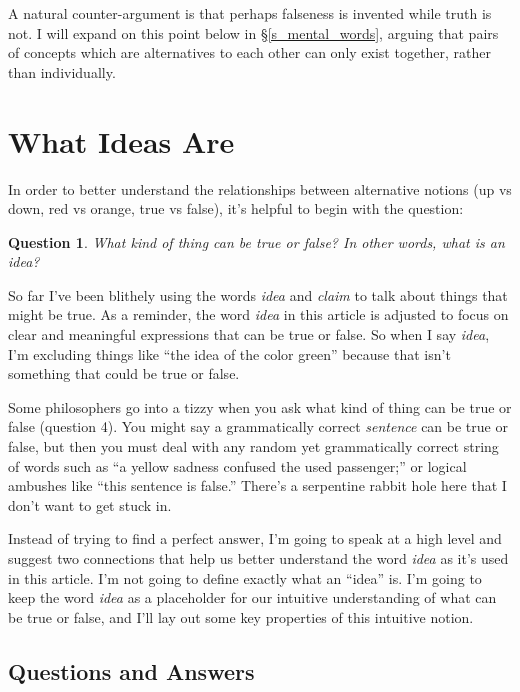 \documentclass[11pt, oneside]{article}
\newtheorem*{question*}{Question}
\begin{document}
A natural counter-argument is that perhaps falseness is invented while truth is
not.
I will expand on this point below in \S\ref{s_mental_words},
arguing that pairs of concepts which are alternatives to
each other can only exist together,
rather than individually.

\section{What Ideas Are}

In order to better understand the relationships between alternative
notions (up vs down, red vs orange, true vs false), it's
helpful to begin with the question:
\begin{question*}
    What kind of thing can be true or false?
    In other words, what is an idea?
\end{question*}

So far I've been blithely using the words {\em idea} and {\em claim} to talk
about things that might be true.
As a reminder, the word {\em idea} in this article is adjusted to focus on
clear and meaningful expressions that can be true or false.
So when I say {\em idea}, I'm excluding
things like ``the idea of the color green'' because that isn't something that
could be true or false.

Some philosophers go into a tizzy when you ask
what kind of thing can be true or false (question 4).
You might say a grammatically correct {\em sentence} can be true or false,
but then you must deal with any random yet grammatically correct string
of words such as
``a yellow sadness confused the used
passenger;'' or logical ambushes like ``this sentence is false.''
There's a serpentine rabbit hole here that I don't want to get stuck in.

Instead of trying to find a perfect answer, I'm going to speak at a high level
and suggest two connections that help us better understand the word {\em idea}
as it's used in this article.
I'm not going to define exactly what an ``idea'' is.
I'm going to keep the word {\em idea} as a placeholder for our
intuitive understanding of what can be true or false, and I'll lay out some key
properties of this intuitive notion.

\subsection{Questions and Answers}
\end{document}
